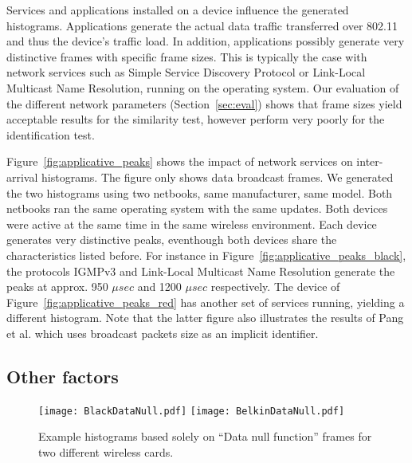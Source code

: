 \documentclass[10pt, conference, compsocconf, letterpaper]{IEEEtran}
\begin{document}
Services and applications installed on a device influence the generated histograms. 
Applications generate the actual data traffic transferred over 802.11 and thus the device's traffic load. 
In addition, applications possibly generate very distinctive frames with specific frame sizes.
This is typically the case with network services such as Simple Service Discovery Protocol or Link-Local Multicast Name Resolution, running on the operating system. 
Our evaluation of the different network parameters (Section~\ref{sec:eval}) shows that frame sizes yield acceptable results for the
similarity test, however perform very poorly for the identification test.

Figure~\ref{fig:applicative_peaks} shows the impact of network services on inter-arrival histograms.
The figure only shows data broadcast frames. We generated the two histograms using two netbooks, same manufacturer, same model. Both netbooks ran the same operating system with the same updates. Both devices were active at the same time in the same wireless environment.  
Each device generates very distinctive peaks, eventhough both devices share the characteristics listed before. 
For instance in Figure~\ref{fig:applicative_peaks_black}, the protocols IGMPv3 and Link-Local Multicast Name Resolution generate the peaks at approx. 950 $\mu sec$ and 1200 $\mu sec$ respectively.
The device of Figure~\ref{fig:applicative_peaks_red} has another set of services running, yielding a different histogram.
Note that the latter figure also illustrates the results of Pang et al. \cite{Pang:Mobicom} which uses broadcast packets size as an implicit identifier.






\subsection{Other factors}

\begin{figure}
\begin{center}
\texttt{[image: BlackDataNull.pdf]}
\texttt{[image: BelkinDataNull.pdf]}
\caption{Example histograms based solely on ``Data null function'' frames for two different wireless cards.}
\label{fig:histogrampowersavemode}
\end{center}
\end{figure}
\end{document}
